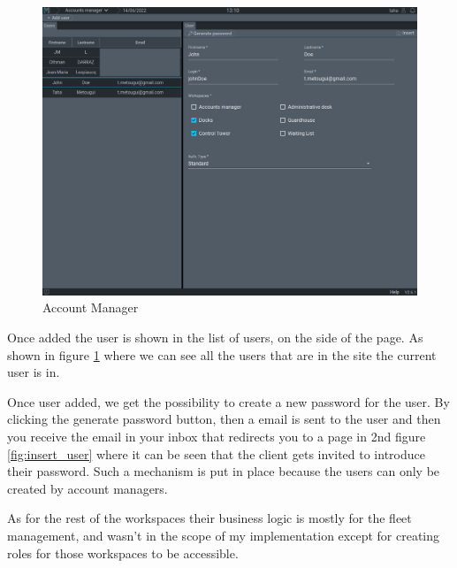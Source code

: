\begin{figure}[!ht]
    \centering
    \includegraphics[width=\textwidth]{images/accManager}
    \caption{Account Manager}
    \label{fig:accManager}
\end{figure}

Once added the user is shown in the list of users, on the side of the page. As shown in 
figure \ref{fig:accManager} where we can see all the users that are in the site the 
current user is in.

Once user added, we get the possibility to create a new password for the user. By clicking
the generate password button, then a email is sent to the user and then you receive the
email in your inbox that redirects you to a page in 2nd figure \ref{fig:insert_user} where
it can be seen that the client gets invited to introduce their password.
Such a mechanism is put in place because the users can only be created by account managers.

As for the rest of the workspaces their business logic is mostly for the fleet management, 
and wasn't in the scope of my implementation except for creating roles for those workspaces
to be accessible.


